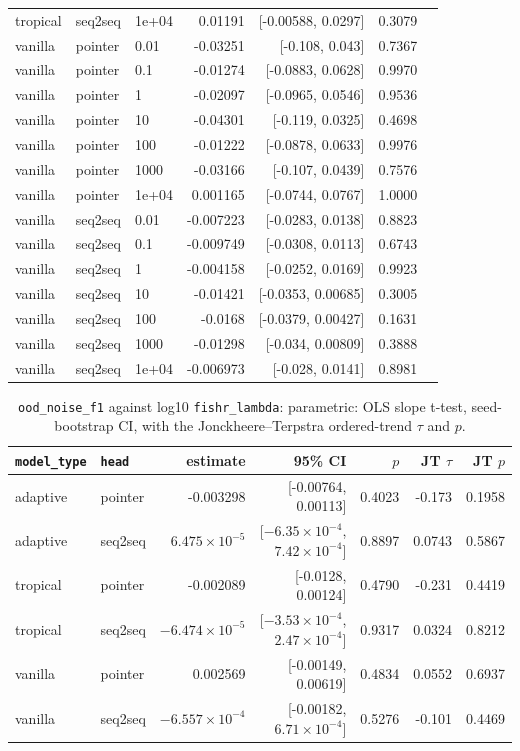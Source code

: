 \documentclass[10pt]{article}
\begin{document}
{\begin{longtable}{lllrrrl}
tropical & seq2seq & 1e+04 & 0.01191 & [-0.00588, 0.0297] & 0.3079 & \\
vanilla & pointer & 0.01 & -0.03251 & [-0.108, 0.043] & 0.7367 & \\
vanilla & pointer & 0.1 & -0.01274 & [-0.0883, 0.0628] & 0.9970 & \\
vanilla & pointer & 1 & -0.02097 & [-0.0965, 0.0546] & 0.9536 & \\
vanilla & pointer & 10 & -0.04301 & [-0.119, 0.0325] & 0.4698 & \\
vanilla & pointer & 100 & -0.01222 & [-0.0878, 0.0633] & 0.9976 & \\
vanilla & pointer & 1000 & -0.03166 & [-0.107, 0.0439] & 0.7576 & \\
vanilla & pointer & 1e+04 & 0.001165 & [-0.0744, 0.0767] & 1.0000 & \\
vanilla & seq2seq & 0.01 & -0.007223 & [-0.0283, 0.0138] & 0.8823 & \\
vanilla & seq2seq & 0.1 & -0.009749 & [-0.0308, 0.0113] & 0.6743 & \\
vanilla & seq2seq & 1 & -0.004158 & [-0.0252, 0.0169] & 0.9923 & \\
vanilla & seq2seq & 10 & -0.01421 & [-0.0353, 0.00685] & 0.3005 & \\
vanilla & seq2seq & 100 & -0.0168 & [-0.0379, 0.00427] & 0.1631 & \\
vanilla & seq2seq & 1000 & -0.01298 & [-0.034, 0.00809] & 0.3888 & \\
vanilla & seq2seq & 1e+04 & -0.006973 & [-0.028, 0.0141] & 0.8981 & \\
\bottomrule
\end{longtable}
}

{\small
\begin{longtable}{llrrrrr}
\caption{\texttt{ood\_noise\_f1} against log10 \texttt{fishr\_lambda}: parametric: OLS slope t-test, seed-bootstrap CI, with the Jonckheere--Terpstra ordered-trend $\tau$ and $p$.}\label{tab:trend-ood_noise_f1}\\
\toprule
\texttt{model\_type} & \texttt{head} & estimate & 95\% CI & $p$ & JT $\tau$ & JT $p$\\
\midrule
\endhead
adaptive & pointer & -0.003298 & [-0.00764, 0.00113] & 0.4023 & -0.173 & 0.1958\\
adaptive & seq2seq & $6.475\times10^{-5}$ & [$-6.35\times10^{-4}$, $7.42\times10^{-4}$] & 0.8897 & 0.0743 & 0.5867\\
tropical & pointer & -0.002089 & [-0.0128, 0.00124] & 0.4790 & -0.231 & 0.4419\\
tropical & seq2seq & $-6.474\times10^{-5}$ & [$-3.53\times10^{-4}$, $2.47\times10^{-4}$] & 0.9317 & 0.0324 & 0.8212\\
vanilla & pointer & 0.002569 & [-0.00149, 0.00619] & 0.4834 & 0.0552 & 0.6937\\
vanilla & seq2seq & $-6.557\times10^{-4}$ & [-0.00182, $6.71\times10^{-4}$] & 0.5276 & -0.101 & 0.4469\\
\bottomrule
\end{longtable}
}
\end{document}

